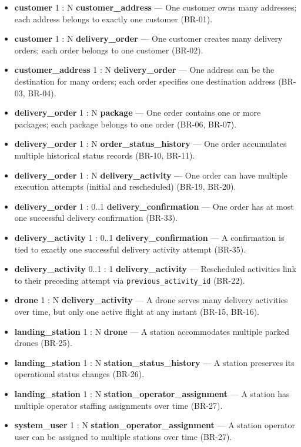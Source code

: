 \begin{itemize}
    \item \textbf{customer} 1 : N \textbf{customer\_address} — One customer owns many addresses; each address belongs to exactly one customer (BR-01).
    \item \textbf{customer} 1 : N \textbf{delivery\_order} — One customer creates many delivery orders; each order belongs to one customer (BR-02).
    \item \textbf{customer\_address} 1 : N \textbf{delivery\_order} — One address can be the destination for many orders; each order specifies one destination address (BR-03, BR-04).
    \item \textbf{delivery\_order} 1 : N \textbf{package} — One order contains one or more packages; each package belongs to one order (BR-06, BR-07).
    \item \textbf{delivery\_order} 1 : N \textbf{order\_status\_history} — One order accumulates multiple historical status records (BR-10, BR-11).
    \item \textbf{delivery\_order} 1 : N \textbf{delivery\_activity} — One order can have multiple execution attempts (initial and rescheduled) (BR-19, BR-20).
    \item \textbf{delivery\_order} 1 : 0..1 \textbf{delivery\_confirmation} — One order has at most one successful delivery confirmation (BR-33).
    \item \textbf{delivery\_activity} 1 : 0..1 \textbf{delivery\_confirmation} — A confirmation is tied to exactly one successful delivery activity attempt (BR-35).
    \item \textbf{delivery\_activity} 0..1 : 1 \textbf{delivery\_activity} — Rescheduled activities link to their preceding attempt via \texttt{previous\_activity\_id} (BR-22).
    \item \textbf{drone} 1 : N \textbf{delivery\_activity} — A drone serves many delivery activities over time, but only one active flight at any instant (BR-15, BR-16).
    \item \textbf{landing\_station} 1 : N \textbf{drone} — A station accommodates multiple parked drones (BR-25).
    \item \textbf{landing\_station} 1 : N \textbf{station\_status\_history} — A station preserves its operational status changes (BR-26).
    \item \textbf{landing\_station} 1 : N \textbf{station\_operator\_assignment} — A station has multiple operator staffing assignments over time (BR-27).
    \item \textbf{system\_user} 1 : N \textbf{station\_operator\_assignment} — A station operator user can be assigned to multiple stations over time (BR-27).

\end{itemize}

